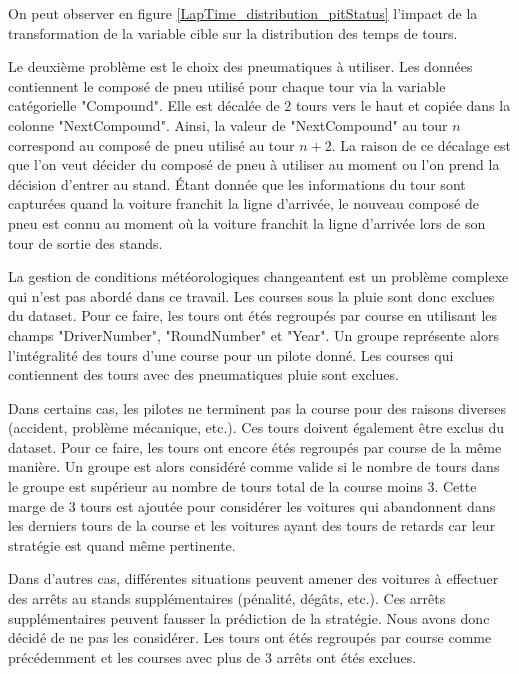 On peut observer en figure \ref{LapTime_distribution_pitStatus} l'impact de la transformation de la variable cible sur la distribution des temps de tours.


Le deuxième problème est le choix des pneumatiques à utiliser. Les données contiennent le composé de pneu utilisé pour chaque tour via la variable catégorielle "Compound".
Elle est décalée de 2 tours vers le haut et copiée dans la colonne "NextCompound". Ainsi, la valeur de "NextCompound" au tour $n$ correspond au composé de pneu utilisé au tour $n+2$.
La raison de ce décalage est que l'on veut décider du composé de pneu à utiliser au moment ou l'on prend la décision d'entrer au stand.
Étant donnée que les informations du tour sont capturées quand la voiture franchit la ligne d'arrivée,
le nouveau composé de pneu est connu au moment où la voiture franchit la ligne d'arrivée lors de son tour de sortie des stands.

La gestion de conditions météorologiques changeantent est un problème complexe qui n'est pas abordé dans ce travail.
Les courses sous la pluie sont donc exclues du dataset. Pour ce faire, les tours ont étés regroupés par course en utilisant les champs "DriverNumber", "RoundNumber" et "Year".
Un groupe représente alors l'intégralité des tours d'une course pour un pilote donné. Les courses qui contiennent des tours avec des pneumatiques pluie sont exclues.

Dans certains cas, les pilotes ne terminent pas la course pour des raisons diverses (accident, problème mécanique, etc.).
Ces tours doivent également être exclus du dataset. Pour ce faire, les tours ont encore étés regroupés par course de la même manière.
Un groupe est alors considéré comme valide si le nombre de tours dans le groupe est supérieur au nombre de tours total de la course moins 3.
Cette marge de 3 tours est ajoutée pour considérer les voitures qui abandonnent dans les derniers tours de la course et les voitures ayant des tours de retards car leur stratégie est quand même pertinente.

Dans d'autres cas, différentes situations peuvent amener des voitures à effectuer des arrêts au stands supplémentaires (pénalité, dégâts, etc.).
Ces arrêts supplémentaires peuvent fausser la prédiction de la stratégie. Nous avons donc décidé de ne pas les considérer.
Les tours ont étés regroupés par course comme précédemment et les courses avec plus de 3 arrêts ont étés exclues.

